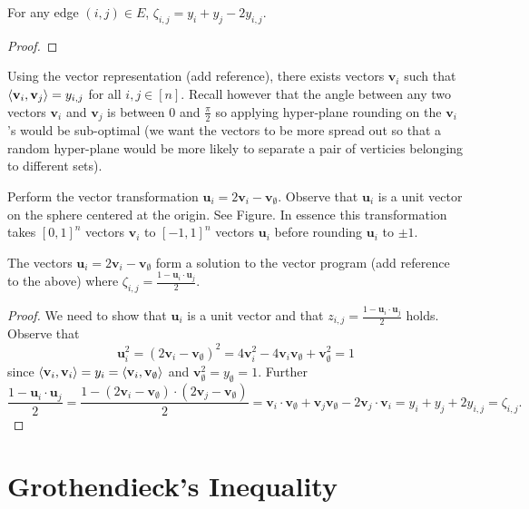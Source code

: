 \documentclass[
10pt, %
letterpaper, %
onecolumn, %
]{article}
\begin{document}
\begin{lemma}
For any edge $(i,j) \in E$, $\zeta_{i,j} = y_i + y_j - 2y_{i,j}$. 
\end{lemma}
\begin{proof}

\end{proof}

Using the vector representation (add reference), there exists vectors $\mathbf{v}_i$ such that $\langle\mathbf{v}_i, \mathbf{v}_j\rangle = y_{i,j}$ for all $i,j \in [n]$. Recall however that the angle between any two vectors $\mathbf{v}_i$ and $\mathbf{v}_j$ is between $0$ and $\frac{\pi}{2}$ so applying hyper-plane rounding on the $\mathbf{v}_i$'s would be sub-optimal (we want the vectors to be more spread out so that a random hyper-plane would be more likely to separate a pair of verticies belonging to different sets).

Perform the vector transformation $\mathbf{u}_i = 2\mathbf{v}_i -\mathbf{v}_{\emptyset}$. Observe that $\mathbf{u}_i$ is a unit vector on the sphere centered at the origin. See Figure. In essence this transformation takes $[0,1]^n$ vectors $\mathbf{v}_i$ to $[-1,1]^n$ vectors $\mathbf{u}_i$ before rounding $\mathbf{u}_i$ to $\pm 1$.  


\begin{lemma}
The vectors $\mathbf{u}_i = 2 \mathbf{v}_i - \mathbf{v}_{\emptyset}$ form a solution to the vector program (add reference to the above) where $\zeta_{i,j} = \frac{1 - \mathbf{u}_i\cdot\mathbf{u}_j}{2}$.
\end{lemma}
\begin{proof}
We need to show that $\mathbf{u}_i$ is a unit vector and that $z_{i,j} = \frac{1 - \mathbf{u}_i\cdot\mathbf{u}_j}{2}$ holds.
Observe that
\[\mathbf{u}_i^2 = (2 \mathbf{v}_i - \mathbf{v}_{\emptyset})^2 = 4\mathbf{v}_i^2 - 4\mathbf{v}_i\mathbf{v}_{\emptyset} + \mathbf{v}_{\emptyset}^2 = 1\]
since $\langle\mathbf{v}_i, \mathbf{v}_i\rangle = y_i = \langle\mathbf{v}_i, \mathbf{v}_{\emptyset}\rangle$ and $\mathbf{v}_{\emptyset}^2 = y_{\emptyset} = 1$. Further
\[\frac{1 - \mathbf{u}_i\cdot\mathbf{u}_j}{2} = \frac{1 - \left(2 \mathbf{v}_i - \mathbf{v}_{\emptyset}\right)\cdot\left(2 \mathbf{v}_j - \mathbf{v}_{\emptyset}\right)}{2} = \mathbf{v}_i\cdot\mathbf{v}_{\emptyset} + \mathbf{v}_j\mathbf{v}_{\emptyset} - 2 \mathbf{v}_j\cdot\mathbf{v}_i = y_{i} + y_{j} + 2y_{i,j} = \zeta_{i,j}.\]
\end{proof}

\section{Grothendieck's Inequality}


\renewcommand{\refname}{Reference} %


\end{document}
